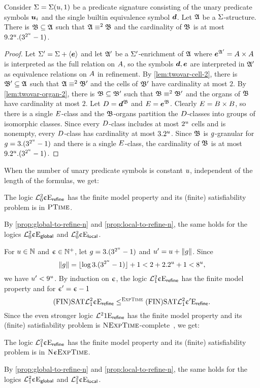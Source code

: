 \begin{remark}
Consider $\mathrm{\Sigma} = \mathrm{\Sigma}(u,1)$ be a predicate signature consisting of the unary
predicate symbols $\bm{u}_{i}$ and the single builtin equivalence symbol $\bm{d}$. 
Let $\mathfrak{A}$ be a $\mathrm{\Sigma}$-structure.
There is $\mathfrak{B} \subseteq \mathfrak{A}$ such that $\mathfrak{A} \equiv^{2} \mathfrak{B}$ and the
cardinality of $\mathfrak{B}$ is at most $9.2^u.(3^{2^u}-1)$.
\end{remark}
\begin{proof}
Let $\mathrm{\Sigma'} = \mathrm{\Sigma} + \left\langle \bm{e} \right\rangle$ and let $\mathfrak{A'}$ be a $\mathrm{\Sigma'}$-enrichment of
$\mathfrak{A}$ where $\bm{e}^{\mathfrak{A'}} = {A\times A}$ is interpreted as the full relation on
$A$, so the symbols $\bm{d}, \bm{e}$ are interpreted in $\mathfrak{A'}$ as equivalence
relations on $A$ in refinement.
By \cref{lem:twovar-cell-2}, there is $\mathfrak{B'} \subseteq \mathfrak{A}$ such that
$\mathfrak{A} \equiv^{2} \mathfrak{B'}$ and the cells of $\mathfrak{B'}$ have cardinality at most $2$.
By \cref{lem:twovar-organ-2}, there is $\mathfrak{B} \subseteq \mathfrak{B'}$ such that
$\mathfrak{B} \equiv^{2} \mathfrak{B'}$ and the organs of $\mathfrak{B}$ have cardinality at most $2$.
Let $D = \bm{d}^{\mathfrak{B}}$ and $E = \bm{e}^{\mathfrak{B}}$.
Clearly $E = {B\times B}$, so there is a single $E$-class and the
$\mathfrak{B}$-organs partition the $D$-classes into groups of isomorphic classes.
Since every $D$-class includes at most $2^u$ cells and is nonempty, every
$D$-class has cardinality at most $3.2^u$.
Since $\mathfrak{B}$ is $g$-granular for $g = 3.(3^{2^u}-1)$ and there is a
single $E$-class, the cardinality of $\mathfrak{B}$ is at most
$9.2^u.(3^{2^u}-1)$.
\end{proof}

When the number of unary predicate symbols is constant $u$, independent of
the length of the formulas, we get:
\begin{proposition}
The logic $\mathcal{L}^{2}_{0}{\upepsilon}\mathrm{E}_{\mathsf{refine}}$ has the finite model
property and its (finite) satisfiability problem is in $\text{\normalfont{\scshape PTime}}$.

By \cref{prop:global-to-refine-n} and \cref{prop:local-to-refine-n},
the same holds for the logics
$\mathcal{L}^{2}_{0}{\upepsilon}\mathrm{E}_{\mathsf{global}}$ and 
$\mathcal{L}^{2}_{0}{\upepsilon}\mathrm{E}_{\mathsf{local}}$.
\end{proposition}

For $u \in \mathbb{N}$ and $\upepsilon \in \mathbb{N}^{+}$, let $g = 3.(3^{2^u}-1)$
and ${u'} = u + \|g\|$.
Since
\[
  \|g\| = \lfloor \log{3.(3^{2^u}-1)} \rfloor + 1 <
   2 + 2.2^u+1 <
   8^u,
\]
we have ${u'} < 9^u$.
By induction on $\upepsilon$, the logic $\mathcal{L}^{2}_{1}{\upepsilon}\mathrm{E}_{\mathsf{refine}}$ has the
finite model property and for ${\upepsilon'} = \upepsilon-1$
\[
\mathrm{(FIN)SAT}\mathcal{L}^{2}_{1}{\upepsilon}\mathrm{E}_{\mathsf{refine}} \leq^{\text{\normalfont{\scshape ExpTime}}}
\mathrm{(FIN)SAT}\mathcal{L}^{2}_{1}{{\upepsilon'}}\mathrm{E}_{\mathsf{refine}}.
\]
Since the even stronger logic $\mathcal{L}^{2}_{{}}{1}\mathrm{E}_{\mathsf{refine}}$ has the
finite model property and its (finite) satisfiability problem is
$\text{\normalfont{\scshape NExpTime}}$-complete~\cite{kieronski2005small}, we get:
\begin{proposition}
The logic $\mathcal{L}^{2}_{1}{\upepsilon}\mathrm{E}_{\mathsf{refine}}$ has the finite model property and
its (finite) satisfiability problem is in $\text{\normalfont{\scshape N}}\upepsilon\text{\normalfont{\scshape ExpTime}}$.

By \cref{prop:global-to-refine-n} and \cref{prop:local-to-refine-n},
the same holds for the logics
$\mathcal{L}^{2}_{1}{\upepsilon}\mathrm{E}_{\mathsf{global}}$ and $\mathcal{L}^{2}_{1}{\upepsilon}\mathrm{E}_{\mathsf{local}}$.
\end{proposition}


